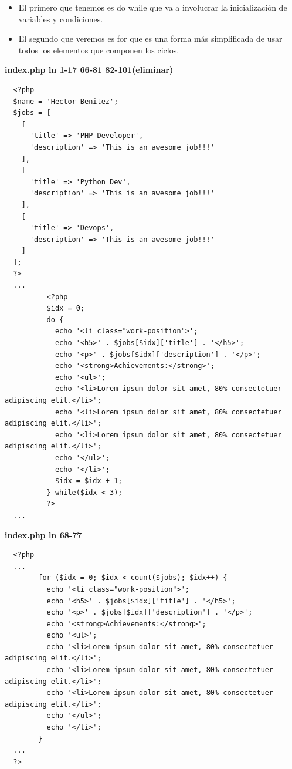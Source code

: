 \documentclass{article}
\begin{document}
\begin{itemize}
  \item El primero que tenemos es do while que va a involucrar la
    inicialización de variables y condiciones.
  \item El segundo que veremos es for que es una forma más simplificada de usar
    todos los elementos que componen los ciclos.
\end{itemize}

\textbf{index.php ln 1-17 66-81 82-101(eliminar)}
\begin{verbatim}
  <?php
  $name = 'Hector Benitez';
  $jobs = [
    [
      'title' => 'PHP Developer',
      'description' => 'This is an awesome job!!!'
    ],
    [
      'title' => 'Python Dev',
      'description' => 'This is an awesome job!!!'
    ],
    [
      'title' => 'Devops',
      'description' => 'This is an awesome job!!!'
    ]
  ];
  ?>
  ...
          <?php
          $idx = 0;
          do {
            echo '<li class="work-position">';
            echo '<h5>' . $jobs[$idx]['title'] . '</h5>';
            echo '<p>' . $jobs[$idx]['description'] . '</p>';
            echo '<strong>Achievements:</strong>';
            echo '<ul>';
            echo '<li>Lorem ipsum dolor sit amet, 80% consectetuer adipiscing elit.</li>';
            echo '<li>Lorem ipsum dolor sit amet, 80% consectetuer adipiscing elit.</li>';
            echo '<li>Lorem ipsum dolor sit amet, 80% consectetuer adipiscing elit.</li>';
            echo '</ul>';
            echo '</li>';
            $idx = $idx + 1;
          } while($idx < 3);
          ?>
  ...
\end{verbatim}

\textbf{index.php ln 68-77}
\begin{verbatim}
  <?php
  ...
        for ($idx = 0; $idx < count($jobs); $idx++) {
          echo '<li class="work-position">';
          echo '<h5>' . $jobs[$idx]['title'] . '</h5>';
          echo '<p>' . $jobs[$idx]['description'] . '</p>';
          echo '<strong>Achievements:</strong>';
          echo '<ul>';
          echo '<li>Lorem ipsum dolor sit amet, 80% consectetuer adipiscing elit.</li>';
          echo '<li>Lorem ipsum dolor sit amet, 80% consectetuer adipiscing elit.</li>';
          echo '<li>Lorem ipsum dolor sit amet, 80% consectetuer adipiscing elit.</li>';
          echo '</ul>';
          echo '</li>';
        }
  ...
  ?>
\end{verbatim}

\newpage
\end{document}
